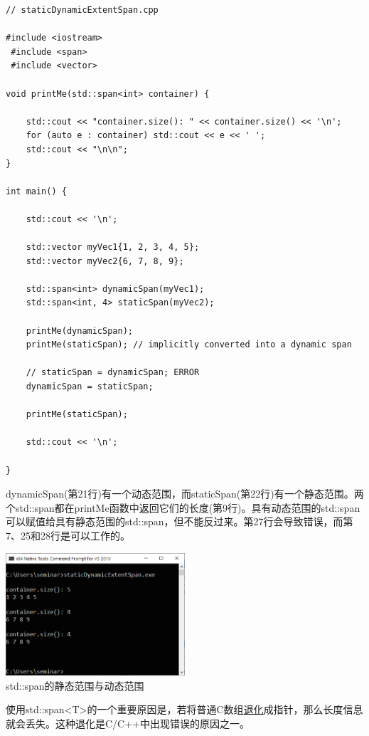 \begin{lstlisting}[style=styleCXX]
// staticDynamicExtentSpan.cpp

#include <iostream>
 #include <span>
 #include <vector>

void printMe(std::span<int> container) {
	
	std::cout << "container.size(): " << container.size() << '\n';
	for (auto e : container) std::cout << e << ' ';
	std::cout << "\n\n";
}

int main() {

	std::cout << '\n';
	
	std::vector myVec1{1, 2, 3, 4, 5};
	std::vector myVec2{6, 7, 8, 9};
	
	std::span<int> dynamicSpan(myVec1);
	std::span<int, 4> staticSpan(myVec2);
	
	printMe(dynamicSpan);
	printMe(staticSpan); // implicitly converted into a dynamic span
	
	// staticSpan = dynamicSpan; ERROR
	dynamicSpan = staticSpan;
	
	printMe(staticSpan);
	
	std::cout << '\n';

}
\end{lstlisting}

dynamicSpan(第21行)有一个动态范围，而staticSpan(第22行)有一个静态范围。两个std::span都在printMe函数中返回它们的长度(第9行)。具有动态范围的std::span可以赋值给具有静态范围的std::span，但不能反过来。第27行会导致错误，而第7、25和28行是可以工作的。

\begin{center}
\includegraphics[width=0.5\textwidth]{content/3/chapter5/images/4.png}\\
std::span的静态范围与动态范围
\end{center}

使用std::span<T>的一个重要原因是，若将普通C数组\href{https://en.cppreference.com/w/cpp/types/decay}{退化}成指针，那么长度信息就会丢失。这种退化是C/C++中出现错误的原因之一。


